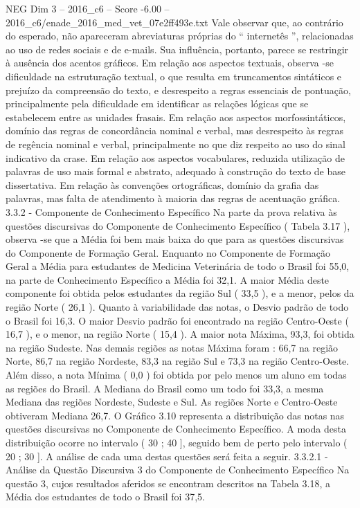 \begin{textsample}{NEG Dim 3 – 2016\_c6 – Score -6.00 – 2016\_c6/enade\_2016\_med\_vet\_07e2ff493e.txt}
Vale observar que, ao contrário do esperado, não apareceram abreviaturas próprias do “ internetês ”, relacionadas ao uso de redes sociais e de e-mails.
Sua influência, portanto, parece se restringir à ausência dos acentos gráficos.
Em relação aos aspectos textuais, observa -se dificuldade na estruturação textual, o que resulta em truncamentos sintáticos e prejuízo da compreensão do texto, e desrespeito a regras essenciais de pontuação, principalmente pela dificuldade em identificar as relações lógicas que se estabelecem entre as unidades frasais.
Em relação aos aspectos morfossintáticos, domínio das regras de concordância nominal e verbal, mas desrespeito às regras de regência nominal e verbal, principalmente no que diz respeito ao uso do sinal indicativo da crase.
Em relação aos aspectos vocabulares, reduzida utilização de palavras de uso mais formal e abstrato, adequado à construção do texto de base dissertativa.
Em relação às convenções ortográficas, domínio da grafia das palavras, mas falta de atendimento à maioria das regras de acentuação gráfica. 3.3.2 - Componente de Conhecimento Específico Na parte da prova relativa às questões discursivas do Componente de Conhecimento Específico ( Tabela 3.17 ), observa -se que a Média foi bem mais baixa do que para as questões discursivas do Componente de Formação Geral.
Enquanto no Componente de Formação Geral a Média para estudantes de Medicina Veterinária de todo o Brasil foi 55,0, na parte de Conhecimento Específico a Média foi 32,1.
A maior Média deste componente foi obtida pelos estudantes da região Sul ( 33,5 ), e a menor, pelos da região Norte ( 26,1 ).
Quanto à variabilidade das notas, o Desvio padrão de todo o Brasil foi 16,3.
O maior Desvio padrão foi encontrado na região Centro-Oeste ( 16,7 ), e o menor, na região Norte ( 15,4 ).
A maior nota Máxima, 93,3, foi obtida na região Sudeste.
Nas demais regiões as notas Máxima foram : 66,7 na região Norte, 86,7 na região Nordeste, 83,3 na região Sul e 73,3 na região Centro-Oeste.
Além disso, a nota Mínima ( 0,0 ) foi obtida por pelo menos um aluno em todas as regiões do Brasil.
A Mediana do Brasil como um todo foi 33,3, a mesma Mediana das regiões Nordeste, Sudeste e Sul.
As regiões Norte e Centro-Oeste obtiveram Mediana 26,7.
O Gráfico 3.10 representa a distribuição das notas nas questões discursivas no Componente de Conhecimento Específico.
A moda desta distribuição ocorre no intervalo ( 30 ; 40 ], seguido bem de perto pelo intervalo ( 20 ; 30 ].
A análise de cada uma destas questões será feita a seguir. 3.3.2.1 - Análise da Questão Discursiva 3 do Componente de Conhecimento Específico Na questão 3, cujos resultados aferidos se encontram descritos na Tabela 3.18, a Média dos estudantes de todo o Brasil foi 37,5.

\end{textsample}
